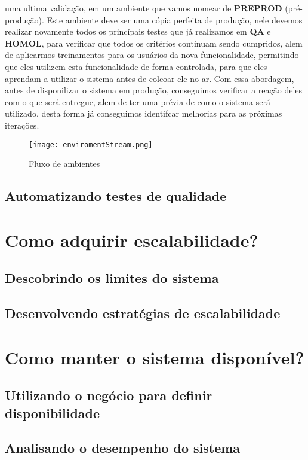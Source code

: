     uma ultima validação, em um ambiente que vamos nomear de \textbf{PREPROD}
    (pré-produção). Este ambiente deve ser uma cópia perfeita de produção, nele
    devemos realizar novamente todos os princípais testes que já realizamos em
    \textbf{QA} e \textbf{HOMOL}, para verificar que todos os critérios continuam
    sendo cumpridos, alem de aplicarmos treinamentos para os usuários da nova
    funcionalidade, permitindo que eles utilizem esta funcionalidade de forma
    controlada, para que eles aprendam a utilizar o sistema antes de colcoar ele
    no ar. Com essa abordagem, antes de disponilizar o sistema em produção,
    conseguimos verificar a reação deles com o que será entregue, alem de ter uma
    prévia de como o sistema será utilizado, desta forma já conseguimos identifcar
    melhorias para as próximas iterações. \newline

    \begin{figure}[!h]
      \centering
      \texttt{[image: enviromentStream.png]}
      \caption{Fluxo de ambientes}
      \label{Imagem:1}
    \end{figure}

    \subsection{Automatizando testes de qualidade}

  \section{Como adquirir escalabilidade?}
    \subsection{Descobrindo os limites do sistema}
    \subsection{Desenvolvendo estratégias de escalabilidade}

  \section{Como manter o sistema disponível?}
    \subsection{Utilizando o negócio para definir disponibilidade}
    \subsection{Analisando o desempenho do sistema}
